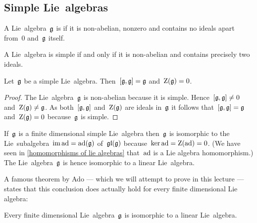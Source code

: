 \subsection{Simple Lie~algebras}


\begin{definition}
 A Lie~algebra~$\mathfrak{g}$ is  if it is non-abelian, nonzero and contains no ideals apart from~$0$ and~$\mathfrak{g}$ itself.
\end{definition}


\begin{remark}
  A Lie~algebra is simple if and only if it is non-abelian and contains precisely two ideals.
\end{remark}


\begin{lemma}
 Let~$\mathfrak{g}$ be a simple Lie~algebra.
 Then~$[\mathfrak{g}, \mathfrak{g}] = \mathfrak{g}$ and~$\operatorname{Z}(\mathfrak{g}) = 0$.
\end{lemma}


\begin{proof}
 The Lie~algebra~$\mathfrak{g}$ is non-abelian because it is simple.
 Hence~$[\mathfrak{g}, \mathfrak{g}] \neq 0$ and~$\operatorname{Z}(\mathfrak{g}) \neq \mathfrak{g}$.
 As both~$[\mathfrak{g}, \mathfrak{g}]$ and~$\operatorname{Z}(\mathfrak{g})$ are ideals in~$\mathfrak{g}$ it follows that~$[\mathfrak{g}, \mathfrak{g}] = \mathfrak{g}$ and~$\operatorname{Z}(\mathfrak{g}) = 0$ because~$\mathfrak{g}$ is simple.
\end{proof}


\begin{remark}
  If~$\mathfrak{g}$ is a finite dimensional simple Lie~algebra then~$\mathfrak{g}$ is isomorphic to the Lie~subalgebra~$\operatorname{im} \operatorname{ad} = \operatorname{ad}(\mathfrak{g})$ of~$\mathfrak{gl}(\mathfrak{g})$ because~$\ker \operatorname{ad} = \operatorname{Z}(\operatorname{ad}) = 0$.
  (We have seen in \cref{homomorphisms of lie algebras} that~$\operatorname{ad}$ is a Lie algebra homomorphism.)
  The Lie~algebra~$\mathfrak{g}$ is hence isomorphic to a linear Lie~algebra.
  
  A famous theorem by Ado --- which we will attempt to prove in this lecture --- states that this conclusion does actually hold for every finite dimensional Lie algebra:
\end{remark}


\begin{theorem}[Ado]
  Every finite dimensional Lie~algebra~$\mathfrak{g}$ is isomorphic to a linear Lie~algebra.
\end{theorem}


